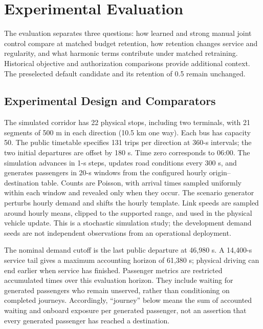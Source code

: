 
\section{Experimental Evaluation}
\label{sec:experiments}

The evaluation separates three questions: how learned and strong manual joint
control compare at matched budget retention, how retention changes service and
regularity, and what harmonic terms contribute under matched retraining.
Historical objective and authorization comparisons provide additional context.
The preselected default candidate and its retention of 0.5 remain unchanged.

\subsection{Experimental Design and Comparators}

The simulated corridor has 22 physical stops, including two terminals, with
21 segments of 500 m in each direction (10.5 km one way). Each bus has capacity
50. The public timetable specifies 131 trips per direction at 360-s intervals;
the two initial departures are offset by 180 s. Time zero corresponds to
06:00. The simulation advances in 1-s steps, updates road conditions every
300 s, and generates passengers in 20-s windows from the configured hourly
origin--destination table. Counts are Poisson, with arrival times sampled
uniformly within each window and revealed only when they occur. The scenario
generator perturbs hourly demand and shifts the hourly template. Link speeds
are sampled around hourly means, clipped to the supported range, and used in
the physical vehicle update. This is a stochastic simulation study; the
development demand seeds are not independent observations from an operational
deployment.

The nominal demand cutoff is the last public departure at 46,980 s. A
14,400-s service tail gives a maximum accounting horizon of 61,380 s; physical
driving can end earlier when service has finished. Passenger metrics are
restricted accumulated times over this evaluation horizon. They include
waiting for generated passengers who remain unserved, rather than conditioning
on completed journeys. Accordingly, ``journey'' below means the sum of
accounted waiting and onboard exposure per generated passenger, not an assertion
that every generated passenger has reached a destination.

